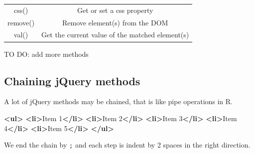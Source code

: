 \documentclass[]{book}
\newenvironment{Shaded}{\begin{snugshade}}{\end{snugshade}}
\newcommand{\AttributeTok}[1]{\textcolor[rgb]{0.77,0.63,0.00}{#1}}
\newcommand{\CommentTok}[1]{\textcolor[rgb]{0.56,0.35,0.01}{\textit{#1}}}
\newcommand{\KeywordTok}[1]{\textcolor[rgb]{0.13,0.29,0.53}{\textbf{#1}}}
\newcommand{\NormalTok}[1]{#1}
\newcommand{\OperatorTok}[1]{\textcolor[rgb]{0.81,0.36,0.00}{\textbf{#1}}}
\newcommand{\StringTok}[1]{\textcolor[rgb]{0.31,0.60,0.02}{#1}}
\begin{document}
\begin{longtable}[]{@{}cc@{}}
\begin{minipage}[t]{0.42\columnwidth}\centering
css()\strut
\end{minipage} & \begin{minipage}[t]{0.52\columnwidth}\centering
Get or set a css property\strut
\end{minipage}\tabularnewline
\begin{minipage}[t]{0.42\columnwidth}\centering
remove()\strut
\end{minipage} & \begin{minipage}[t]{0.52\columnwidth}\centering
Remove element(s) from the DOM\strut
\end{minipage}\tabularnewline
\begin{minipage}[t]{0.42\columnwidth}\centering
val()\strut
\end{minipage} & \begin{minipage}[t]{0.52\columnwidth}\centering
Get the current value of the matched element(s)\strut
\end{minipage}\tabularnewline
\bottomrule
\end{longtable}

TO DO: add more methods

\hypertarget{chaining-jquery-methods}{%
\subsection{Chaining jQuery methods}\label{chaining-jquery-methods}}

A lot of jQuery methods may be chained, that is like pipe operations in R.

\begin{Shaded}
\begin{Highlighting}[]
\KeywordTok{<ul>}
  \KeywordTok{<li>}\NormalTok{Item 1}\KeywordTok{</li>}
  \KeywordTok{<li>}\NormalTok{Item 2}\KeywordTok{</li>}
  \KeywordTok{<li>}\NormalTok{Item 3}\KeywordTok{</li>}
  \KeywordTok{<li>}\NormalTok{Item 4}\KeywordTok{</li>}
  \KeywordTok{<li>}\NormalTok{Item 5}\KeywordTok{</li>}
\KeywordTok{</ul>}
\end{Highlighting}
\end{Shaded}

We end the chain by \texttt{;} and each step is indent by 2 spaces in the right direction.

\begin{Shaded}
\end{Shaded}
\end{document}
